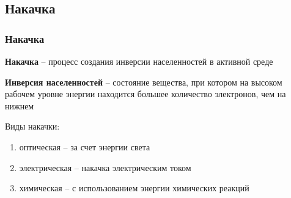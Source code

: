 \documentclass[10pt,pdf,hyperref={unicode}, dvipsnames]{beamer}
\newcommand\frametitless[1]{\subsection{#1}\frametitle{#1}}
\begin{document}
\begin{frame}[t]
	\frametitless{Накачка}
	\textbf{Накачка} -- процесс создания инверсии населенностей в активной среде 

	\vspace{1em}
	\textbf{Инверсия населенностей} -- состояние вещества, при  котором на высоком рабочем уровне энергии находится большее количество электронов, чем на нижнем

	\vspace{1em}
	Виды накачки: 
	\begin{enumerate}
		\item оптическая – за счет энергии света
		\item электрическая – накачка электрическим током
		\item химическая – с использованием энергии химических реакций
	\end{enumerate}
\end{frame}
\end{document}
